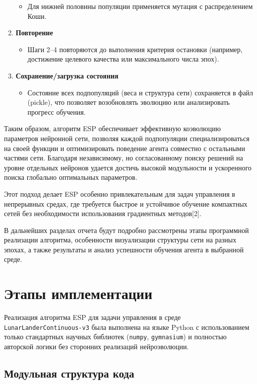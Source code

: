 \documentclass[a4paper,12pt]{article}
\begin{document}
\begin{enumerate}
\begin{itemize}
		\item Для нижней половины популяции применяется мутация с распределением Коши.
	\end{itemize}
	\item \textbf{Повторение}
	\begin{itemize}
		\item Шаги 2--4 повторяются до выполнения критерия остановки (например, достижение целевого качества или максимального числа эпох).
	\end{itemize}
	\item \textbf{Сохранение/загрузка состояния}
	\begin{itemize}
		\item Состояние всех подпопуляций (веса и структура сети) сохраняется в файл (pickle), что позволяет возобновлять эволюцию или анализировать прогресс обучения.
	\end{itemize}
\end{enumerate}

Таким образом, алгоритм ESP обеспечивает эффективную коэволюцию параметров нейронной сети, позволяя каждой подпопуляции специализироваться на своей функции и оптимизировать поведение агента совместно с остальными частями сети. Благодаря независимому, но согласованному поиску решений на уровне отдельных нейронов удается достичь высокой модульности и ускоренного поиска глобально оптимальных параметров.

Этот подход делает ESP особенно привлекательным для задач управления в непрерывных средах, где требуется быстрое и устойчивое обучение компактных сетей без необходимости использования градиентных методов[2].

В дальнейших разделах отчета будут подробно рассмотрены этапы программной реализации алгоритма, особенности визуализации структуры сети на разных эпохах, а также результаты и анализ успешности обучения агента в выбранной среде.

\section{Этапы имплементации}

Реализация алгоритма ESP для задачи управления в среде \texttt{LunarLanderContinuous-v3} была выполнена на языке Python с использованием только стандартных научных библиотек (\texttt{numpy}, \texttt{gymnasium}) и полностью авторской логики без сторонних реализаций нейроэволюции.

\subsection{Модульная структура кода}
\end{document}
